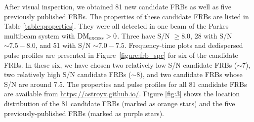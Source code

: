 \documentclass[fleqn,usenatbib]{mnras}
\begin{document}
After visual inspection, we obtained 81 new candidate FRBs as well as five previously published FRBs. 
The properties of these candidate FRBs are listed in Table \ref{table:properties}. 
They were all detected in one beam of the Parkes multibeam system with ${\rm DM}_{\rm excess}>0$. 
Three have S/N $\ge 8.0$, 28  with S/N $\sim7.5-8.0$, and 51 with S/N $\sim7.0-7.5$.
Frequency-time plots and dedispersed pulse profiles are presented in Figure~\ref{figure:frb_spc} for six of the candidate FRBs. In these six, we have chosen two relatively low S/N candidate FRBs ($\sim$7), two relatively high S/N candidate FRBs ($\sim$8), and two candidate FRBs whose S/N are around 7.5. The properties and pulse profiles for all 81 candidate FRBs are available from \url{https://astroyx.github.io/}.
Figure \ref{fig:3} shows the location distribution of the 81 candidate FRBs (marked as orange stars) and the five  previously-published FRBs (marked as purple stars).




\end{document}
